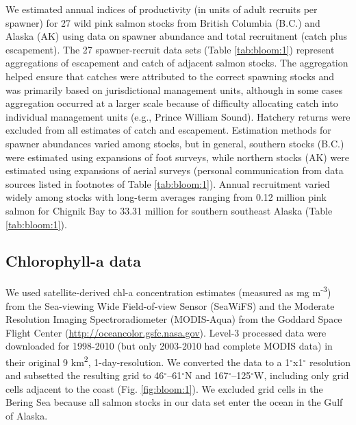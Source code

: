 We estimated annual indices of productivity (in units of adult recruits per
spawner) for 27 wild pink salmon stocks from British Columbia (B.C.) and Alaska
(AK) using data on spawner abundance and total recruitment (catch plus
escapement). The 27 spawner-recruit data sets (Table \ref{tab:bloom:1})
represent aggregations of escapement and catch of adjacent salmon stocks. The
aggregation helped ensure that catches were attributed to the correct spawning
stocks and was primarily based on jurisdictional management units, although in
some cases aggregation occurred at a larger scale because of difficulty
allocating catch into individual management units (e.g., Prince William Sound).
Hatchery returns were excluded from all estimates of catch and escapement.
Estimation methods for spawner abundances varied among stocks, but in general,
southern stocks (B.C.) were estimated using expansions of foot surveys, while
northern stocks (AK) were estimated using expansions of aerial surveys (personal
communication from data sources listed in footnotes of Table \ref{tab:bloom:1}).
Annual recruitment varied widely among stocks with long-term averages ranging
from 0.12 million pink salmon for Chignik Bay to 33.31 million for southern
southeast Alaska (Table \ref{tab:bloom:1}).

\subsection{Chlorophyll-a data}

We used satellite-derived chl-a concentration estimates (measured as mg
m\textsuperscript{-3}) from the Sea-viewing Wide Field-of-view Sensor (SeaWiFS)
and the Moderate Resolution Imaging Spectroradiometer (MODIS-Aqua) from the
Goddard Space Flight Center (\url{http://oceancolor.gsfc.nasa.gov}). Level-3
processed data were downloaded for 1998-2010 (but only 2003-2010 had complete
MODIS data) in their original 9 km\textsuperscript{2}, 1-day-resolution. We
converted the data to a 1$^{\circ}$x1$^{\circ}$ resolution and subsetted the
resulting grid to 46$^{\circ}$--61$^{\circ}$N and 167$^{\circ}$--125$^{\circ}$W,
including only grid cells adjacent to the coast (Fig. \ref{fig:bloom:1}). We
excluded grid cells in the Bering Sea because all salmon stocks in our data set
enter the ocean in the Gulf of Alaska.

